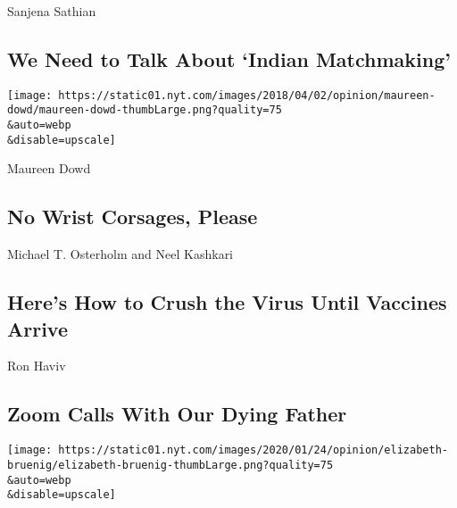 \href{/2020/08/05/opinion/sunday/indian-matchmaking-netflix.html}{}

Sanjena Sathian

\hypertarget{we-need-to-talk-about-indian-matchmaking}{%
\subsection{We Need to Talk About `Indian
Matchmaking'}\label{we-need-to-talk-about-indian-matchmaking}}

\href{/2020/08/08/opinion/sunday/biden-vice-president-geraldine-ferraro.html}{}

\texttt{[image: https://static01.nyt.com/images/2018/04/02/opinion/maureen-dowd/maureen-dowd-thumbLarge.png?quality=75\\\&auto=webp\\\&disable=upscale]}

Maureen Dowd

\hypertarget{no-wrist-corsages-please}{%
\subsection{No Wrist Corsages, Please}\label{no-wrist-corsages-please}}

\href{/2020/08/07/opinion/coronavirus-lockdown-unemployment-death.html}{}

Michael T. Osterholm and Neel Kashkari

\hypertarget{heres-how-to-crush-the-virus-until-vaccines-arrive}{%
\subsection{Here's How to Crush the Virus Until Vaccines
Arrive}\label{heres-how-to-crush-the-virus-until-vaccines-arrive}}

\href{/2020/08/06/opinion/sunday/coronavirus-baruch-haviv-death.html}{}

Ron Haviv

\hypertarget{zoom-calls-with-our-dying-father}{%
\subsection{Zoom Calls With Our Dying
Father}\label{zoom-calls-with-our-dying-father}}

\href{/2020/08/06/opinion/sunday/gloria-purvis-george-floyd-blm.html}{}

\texttt{[image: https://static01.nyt.com/images/2020/01/24/opinion/elizabeth-bruenig/elizabeth-bruenig-thumbLarge.png?quality=75\\\&auto=webp\\\&disable=upscale]}

